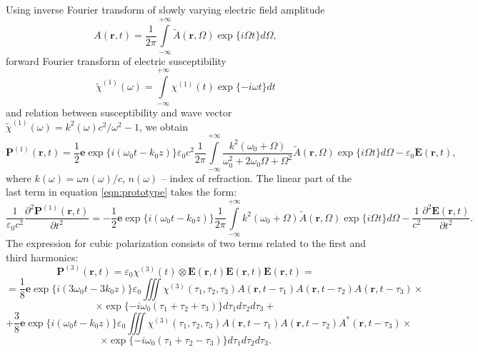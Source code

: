 \documentclass[a4paper, 12pt]{article}
\begin{document}
Using inverse Fourier transform of slowly varying electric field amplitude 
\begin{equation}
A(\mathbf{r}, t) = \frac1{2 \pi} \int\limits_{-\infty}^{+\infty} \tilde{A}(\mathbf{r}, \Omega) \exp \{ i \Omega t \} d \Omega,
\end{equation}
forward Fourier transform of electric susceptibility
\begin{equation}
\label{eqn:susceptibility_fourier}
\tilde{\chi}^{(1)}(\omega) = \int\limits_{-\infty}^{+\infty} \chi^{(1)}(t) \exp \{ -i \omega t \} dt
\end{equation}
and relation between susceptibility and wave vector $\tilde{\chi}^{(1)}(\omega) = k^2(\omega) c^2 / \omega^2 - 1$, we obtain
\begin{equation}
\mathbf{P}^{(1)}(\mathbf{r}, t) = \frac1{2}\mathbf{e} \exp\{i (\omega_0 t  - k_0 z)\} \varepsilon_0 c^2 \frac1{2 \pi} \int\limits_{-\infty}^{+\infty} \frac{k^2(\omega_0 + \Omega)}{\omega_0^2 + 2 \omega_0 \Omega + \Omega^2} \tilde{A}(\mathbf{r}, \Omega) \exp \{ i \Omega t \} d \Omega - \varepsilon_0 \mathbf{E}(\mathbf{r}, t),
\end{equation}
where $k(\omega) = \omega n(\omega)/ c$, $n(\omega)$ -- index of refraction. The linear part of the last term in equation \eqref{eqn:prototype} takes the form:
\begin{equation}
\label{eqn:p1_derivative}
\frac1{\varepsilon_0 c^2} \frac{\partial^2 \mathbf{P}^{(1)}(\mathbf{r}, t)}{\partial t^2} = -\frac1{2}\mathbf{e} \exp\{i (\omega_0 t  - k_0 z)\}   \frac1{2 \pi} \int\limits_{-\infty}^{+\infty} k^2(\omega_0 + \Omega) \tilde{A}(\mathbf{r}, \Omega) \exp \{ i \Omega t \} d \Omega - \frac1{c^2} \frac{\partial^2 \mathbf{E}(\mathbf{r}, t)}{\partial t^2}.
\end{equation}
The expression for cubic polarization consists of two terms related to the first and third harmonics:
\[
\mathbf{P}^{(3)}(\mathbf{r}, t) = \varepsilon_0  \chi^{(3)}(t) \otimes \mathbf{E}(\mathbf{r}, t) \mathbf{E}(\mathbf{r}, t) \mathbf{E}(\mathbf{r}, t) =
\]
\[= \frac1{8} \mathbf{e} \exp \{ i (3 \omega_0 t - 3 k_0 z) \}\varepsilon_0  \iiint \chi^{(3)}(\tau_1, \tau_2, \tau_3) A(\mathbf{r}, t - \tau_1)  A(\mathbf{r}, t - \tau_2) A(\mathbf{r}, t - \tau_3) \times 
\]
\[
 \times \exp\{-i \omega_0 (\tau_1 + \tau_2 + \tau_3) \} d\tau_1 d\tau_2 d \tau_3 + 
\]
\[
+ \frac{3}{8} \mathbf{e} \exp \{ i (\omega_0 t - k_0 z) \} \varepsilon_0  \iiint \chi^{(3)}(\tau_1, \tau_2, \tau_3) A(\mathbf{r}, t - \tau_1)  A(\mathbf{r}, t - \tau_2)  A^*(\mathbf{r}, t - \tau_3) \times 
\]
\begin{equation}
\times \exp\{-i \omega_0 (\tau_1 + \tau_2 - \tau_3) \} d\tau_1 d\tau_2 d \tau_3.
\end{equation}
\end{document}
